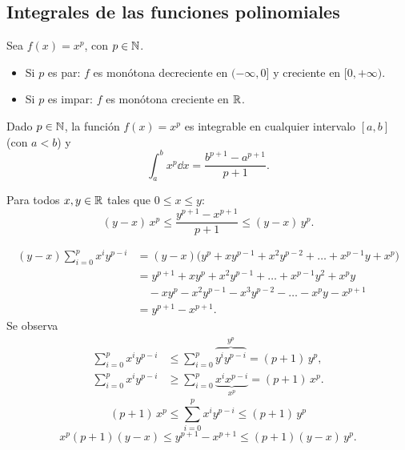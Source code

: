 \documentclass[11pt,a4paper]{article}
\begin{document}

\subsection{Integrales de las funciones polinomiales}

\begin{observacion}
Sea $f(x)=x^p$, con $p\in\mathbb{N}$.
\begin{itemize}
  \item Si $p$ es par: $f$ es monótona decreciente en $(-\infty,0]$ y creciente en $[0,+\infty)$.
  \item Si $p$ es impar: $f$ es monótona creciente en $\mathbb{R}$.
\end{itemize}
\end{observacion}

\begin{proposicion}
Dado $p\in\mathbb{N}$, la función $f(x)=x^p$ es integrable en cualquier intervalo $[a,b]$ (con $a<b$) y
\[
  \int_a^b x^p\dd x=\frac{b^{p+1}-a^{p+1}}{p+1}.
\]
\end{proposicion}

\begin{lema}
Para todos $x,y\in\mathbb{R}$ tales que $0\le x\le y$:
\[
  (y-x)\,x^p\le\frac{y^{p+1}-x^{p+1}}{p+1}\le(y-x)\,y^p.
\]
\end{lema}

\begin{demo}
\begin{align*}
  (y-x)\sum_{i=0}^{p}x^iy^{p-i}
  &=(y-x)\bigl(y^p+xy^{p-1}+x^2y^{p-2}+\dots+x^{p-1}y+x^p\bigr)\\
  &=y^{p+1}+xy^p+x^2y^{p-1}+\dots+x^{p-1}y^2+x^py\\
  &\quad-xy^p-x^2y^{p-1}-x^3y^{p-2}-\dots-x^py-x^{p+1}\\
  &=y^{p+1}-x^{p+1}.
\end{align*}
Se observa
\begin{align*}
  \sum_{i=0}^{p}x^iy^{p-i}&\le\sum_{i=0}^{p}\overbrace{y^iy^{p-i}}^{y^p}=(p+1)\,y^p,\\
  \sum_{i=0}^{p}x^iy^{p-i}&\ge\sum_{i=0}^{p}\underbrace{x^ix^{p-i}}_{x^p}=(p+1)\,x^p.
\end{align*}
\[
  (p+1)\,x^p\le\sum_{i=0}^{p}x^iy^{p-i}\le(p+1)\,y^p
\]
\[
  x^p(p+1)(y-x)\le y^{p+1}-x^{p+1}\le(p+1)(y-x)\,y^p.
\]
\end{demo}
\end{document}
